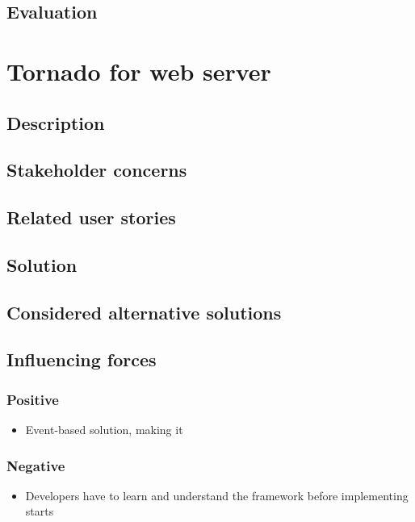 \documentclass[12pt, a4paper]{article}
\begin{document}
\subsection{Evaluation}

\newpage
\section{Tornado for web server}
\subsection{Description}

\subsection{Stakeholder concerns}

\subsection{Related user stories}

\subsection{Solution}

\subsection{Considered alternative solutions}

\subsection{Influencing forces}
\begin{minipage}{0.5\textwidth}
    \subsubsection*{Positive}
    \begin{itemize}
        \item Event-based solution, making it 
    \end{itemize}
\end{minipage}%
\begin{minipage}{0.5\textwidth}
    \subsubsection*{Negative}
    \begin{itemize}
        \item Developers have to learn and understand the framework before implementing starts
    \end{itemize}
\end{minipage}
\end{document}
